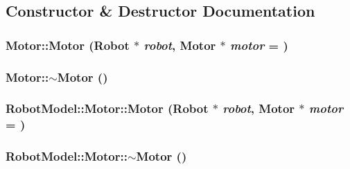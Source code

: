 \subsection{Constructor \& Destructor Documentation}
\hypertarget{class_robot_model_1_1_motor_afa8d3bb8b2ad45bdc8064efa0052dd04}{
\subsubsection[{Motor}]{\setlength{\rightskip}{0pt plus 5cm}Motor::Motor ({\bf Robot} $\ast$ {\em robot}, \/  {\bf Motor} $\ast$ {\em motor} = {})}}
\label{class_robot_model_1_1_motor_afa8d3bb8b2ad45bdc8064efa0052dd04}
\hypertarget{class_robot_model_1_1_motor_a2e57c7b2681efea1d3b7f253ee88ecd4}{
\subsubsection[{$\sim$Motor}]{\setlength{\rightskip}{0pt plus 5cm}Motor::$\sim$Motor ()}}
\label{class_robot_model_1_1_motor_a2e57c7b2681efea1d3b7f253ee88ecd4}
\hypertarget{class_robot_model_1_1_motor_a08854611f8e0f2d4fca849defb99ffe3}{
\subsubsection[{Motor}]{\setlength{\rightskip}{0pt plus 5cm}RobotModel::Motor::Motor ({\bf Robot} $\ast$ {\em robot}, \/  {\bf Motor} $\ast$ {\em motor} = {})}}
\label{class_robot_model_1_1_motor_a08854611f8e0f2d4fca849defb99ffe3}
\hypertarget{class_robot_model_1_1_motor_aec13680224c7d1f28ca5f1fc58044577}{
\subsubsection[{$\sim$Motor}]{\setlength{\rightskip}{0pt plus 5cm}RobotModel::Motor::$\sim$Motor ()}}
\label{class_robot_model_1_1_motor_aec13680224c7d1f28ca5f1fc58044577}


